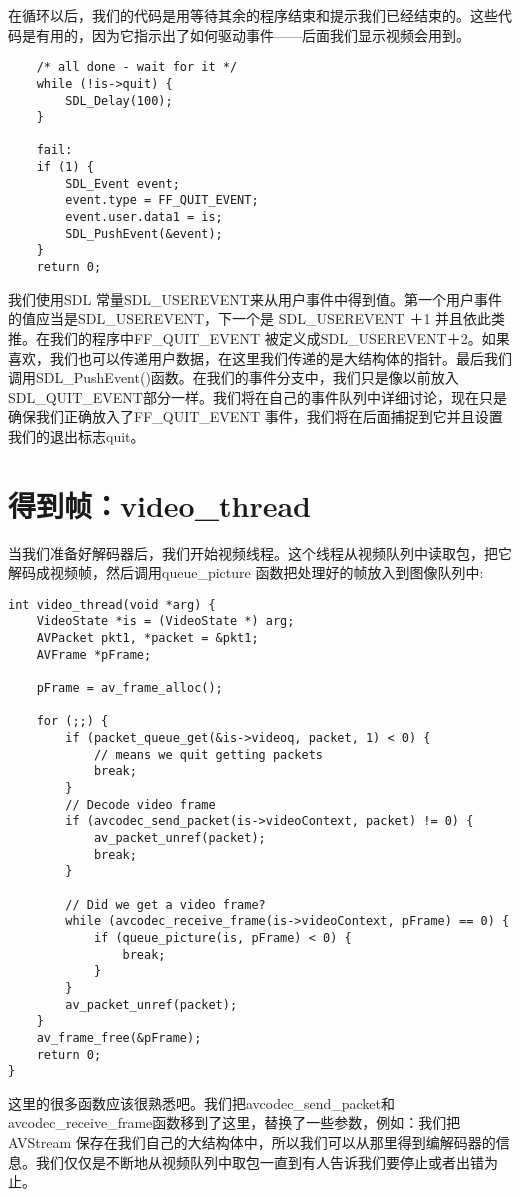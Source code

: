 在循环以后，我们的代码是用等待其余的程序结束和提示我们已经结束的。这些代码是有用的，因为它指示出了如何驱动事件——后面我们显示视频会用到。
\begin{lstlisting}
    /* all done - wait for it */
    while (!is->quit) {
        SDL_Delay(100);
    }

    fail:
    if (1) {
        SDL_Event event;
        event.type = FF_QUIT_EVENT;
        event.user.data1 = is;
        SDL_PushEvent(&event);
    }
    return 0;
\end{lstlisting}

我们使用SDL 常量SDL_USEREVENT来从用户事件中得到值。第一个用户事件的值应当是SDL_USEREVENT，下一个是 SDL_USEREVENT ＋1 并且依此类推。在我们的程序中FF_QUIT_EVENT 被定义成SDL_USEREVENT＋2。如果喜欢，我们也可以传递用户数据，在这里我们传递的是大结构体的指针。最后我们调用SDL_PushEvent()函数。在我们的事件分支中，我们只是像以前放入SDL_QUIT_EVENT部分一样。我们将在自己的事件队列中详细讨论，现在只是确保我们正确放入了FF_QUIT_EVENT 事件，我们将在后面捕捉到它并且设置我们的退出标志quit。

\section{得到帧：video_thread}
当我们准备好解码器后，我们开始视频线程。这个线程从视频队列中读取包，把它解码成视频帧，然后调用queue_picture 函数把处理好的帧放入到图像队列中:
\begin{lstlisting}
int video_thread(void *arg) {
    VideoState *is = (VideoState *) arg;
    AVPacket pkt1, *packet = &pkt1;
    AVFrame *pFrame;

    pFrame = av_frame_alloc();

    for (;;) {
        if (packet_queue_get(&is->videoq, packet, 1) < 0) {
            // means we quit getting packets
            break;
        }
        // Decode video frame
        if (avcodec_send_packet(is->videoContext, packet) != 0) {
            av_packet_unref(packet);
            break;
        }

        // Did we get a video frame?
        while (avcodec_receive_frame(is->videoContext, pFrame) == 0) {
            if (queue_picture(is, pFrame) < 0) {
                break;
            }
        }
        av_packet_unref(packet);
    }
    av_frame_free(&pFrame);
    return 0;
}
\end{lstlisting}

这里的很多函数应该很熟悉吧。我们把avcodec_send_packet和avcodec_receive_frame函数移到了这里，替换了一些参数，例如：我们把AVStream 保存在我们自己的大结构体中，所以我们可以从那里得到编解码器的信息。我们仅仅是不断地从视频队列中取包一直到有人告诉我们要停止或者出错为止。

